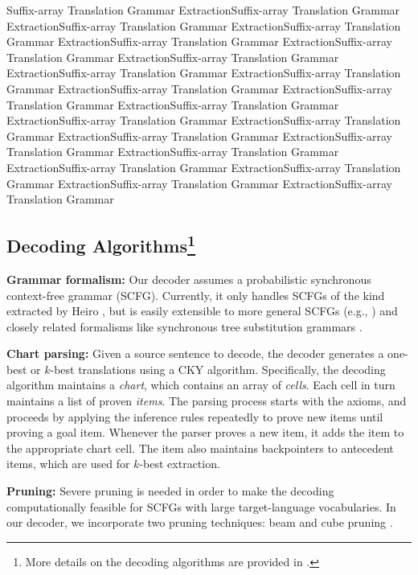 \documentclass[11pt]{article}
\begin{document}
Suffix-array Translation Grammar ExtractionSuffix-array Translation Grammar ExtractionSuffix-array Translation Grammar ExtractionSuffix-array Translation Grammar ExtractionSuffix-array Translation Grammar ExtractionSuffix-array Translation Grammar ExtractionSuffix-array Translation Grammar ExtractionSuffix-array Translation Grammar ExtractionSuffix-array Translation Grammar ExtractionSuffix-array Translation Grammar ExtractionSuffix-array Translation Grammar ExtractionSuffix-array Translation Grammar ExtractionSuffix-array Translation Grammar ExtractionSuffix-array Translation Grammar ExtractionSuffix-array Translation Grammar ExtractionSuffix-array Translation Grammar ExtractionSuffix-array Translation Grammar ExtractionSuffix-array Translation Grammar ExtractionSuffix-array Translation Grammar ExtractionSuffix-array Translation Grammar ExtractionSuffix-array Translation Grammar

\subsection{Decoding Algorithms\footnote{More details on the decoding algorithms are provided in \cite{zhifei-ssst08}.}}

\textbf{Grammar formalism:} Our decoder assumes a probabilistic synchronous context-free grammar (SCFG). Currently, it only handles SCFGs of the kind extracted by Heiro \cite{hiero-david}, but is easily extensible to more general SCFGs (e.g., \cite{syntax2006-isi}) and closely related formalisms like synchronous tree substitution grammars \cite{syntax-jason}.


\textbf{Chart parsing:} Given a source sentence to decode, the decoder generates a one-best or $k$-best translations using a CKY algorithm. Specifically,
the decoding algorithm  maintains a \emph{chart}, which contains an array of \emph{cells}. Each cell in turn maintains a list of proven \emph{items}. The parsing process starts with the axioms, and proceeds by applying the inference rules repeatedly to prove new items until proving a goal item. Whenever the parser proves a new item, it adds the item to the appropriate chart cell. The item also maintains backpointers to antecedent items, which are used for $k$-best extraction.

\textbf{Pruning:} Severe pruning is needed in order to make the decoding computationally feasible for SCFGs with large target-language vocabularies. In our decoder, we incorporate two pruning techniques: beam and cube pruning \cite{hiero-david}.
\end{document}
